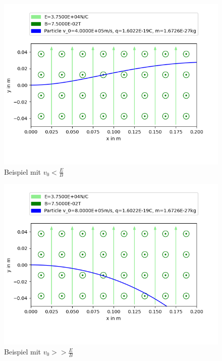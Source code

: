 \documentclass[a4paper, 10pt]{article}
\begin{document}
\begin{figure}[ht]
\caption{Beispiel mit $v_0<\frac{E}{B}$}
\centering
\includegraphics[width=\textwidth]{figure_2}
\end{figure}
\begin{figure}[ht]
\caption{Beispiel mit $v_0>>\frac{E}{B}$}
\centering
\includegraphics[width=\textwidth]{figure_4}
\end{figure}
\end{document}
